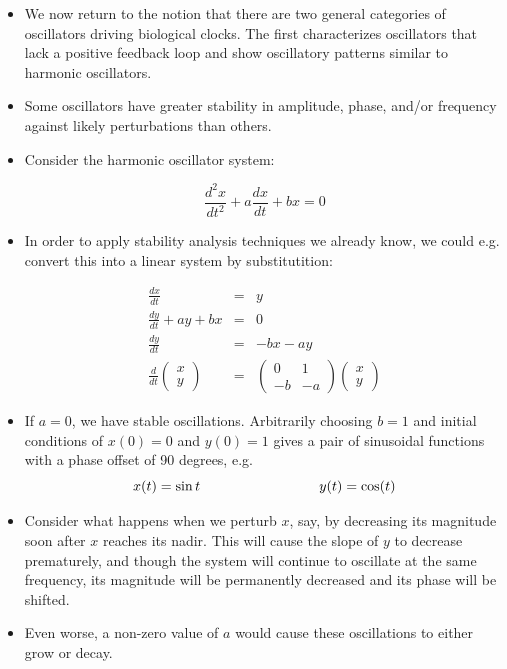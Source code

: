 \documentclass{article}
\begin{document}
\begin{itemize}
\item We now return to the notion that there are two general categories of oscillators driving biological clocks. The first characterizes oscillators that lack a positive feedback loop and show oscillatory patterns similar to harmonic oscillators.

\item Some oscillators have greater stability in amplitude, phase, and/or frequency against likely perturbations than others.

\item Consider the harmonic oscillator system:

\[  \frac{d^2 x}{dt^2} + a \frac{dx}{dt} + bx = 0 \]

\item In order to apply stability analysis techniques we already know, we could e.g. convert this into a linear system by substitutition:

\begin{eqnarray*}
\frac{dx}{dt}  & = & y\\
\frac{dy}{dt} + a y + b x & = & 0\\
\frac{dy}{dt} & = & -b x - a y\\
\frac{d}{dt} \begin{pmatrix} x \\ y \end{pmatrix} & = & \begin{pmatrix} 0 & 1  \\ -b & -a \end{pmatrix} \begin{pmatrix} x \\ y \end{pmatrix}
\end{eqnarray*}

\item If $a=0$, we have stable oscillations. Arbitrarily choosing $b=1$ and initial conditions of $x(0)=0$ and $y(0)=1$ gives a pair of sinusoidal functions with a phase offset of 90 degrees, e.g.
\[ x(t) = \sin t \hspace{3 cm} y(t) = \cos(t) \]

\item Consider what happens when we perturb $x$, say, by decreasing its magnitude soon after $x$ reaches its nadir. This will cause the slope of $y$ to decrease prematurely, and though the system will continue to oscillate at the same frequency, its magnitude will be permanently decreased and its phase will be shifted.

\item Even worse, a non-zero value of $a$ would cause these oscillations to either grow or decay.
\end{itemize}
\end{document}
